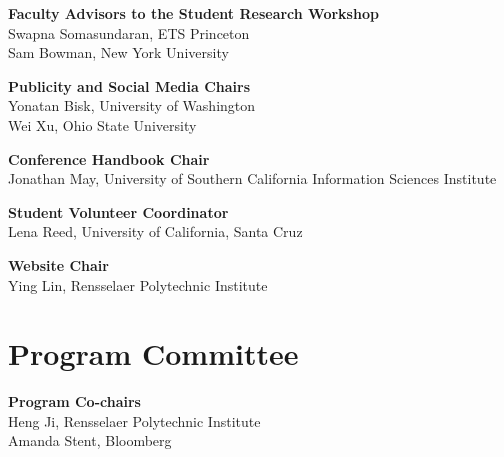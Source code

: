 {\bf Faculty Advisors to the Student Research Workshop} \\
Swapna Somasundaran, ETS Princeton\\
Sam Bowman, New York University

{\bf Publicity and Social Media Chairs} \\
Yonatan Bisk, University of Washington \\
Wei Xu, Ohio State University

{\bf Conference Handbook Chair} \\
Jonathan May, University of Southern California Information Sciences Institute

{\bf Student Volunteer Coordinator} \\
Lena Reed, University of California, Santa Cruz


{\bf Website Chair} \\
Ying Lin, Rensselaer Polytechnic Institute



\clearpage
\section{Program Committee}
\setlength{\parindent}{0pt}

\vspace*{0.5cm}

{\bf Program Co-chairs} \\
Heng Ji, Rensselaer Polytechnic Institute\\
Amanda Stent, Bloomberg

